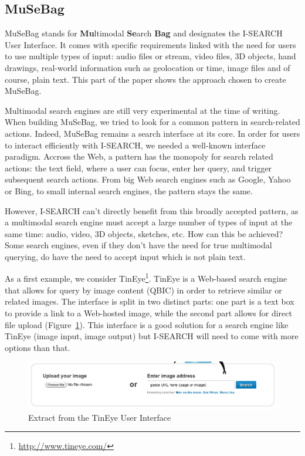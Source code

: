 \documentclass[runningheads,a4paper]{llncs} \usepackage[utf8]{inputenc}
\begin{document}
\subsection{MuSeBag}
MuSeBag stands for {\bf Mu}ltimodal {\bf Se}arch {\bf Bag} and designates the
\mbox{I-SEARCH} User Interface. It comes with specific requirements linked with the need for users to use multiple types of input: audio files or stream, video files, 3D objects, hand drawings, real-world information such as geolocation or time, image files and of course, plain text. This part of the paper shows the approach chosen to create MuSeBag.

Multimodal search engines are still very experimental at the time of writing. When building MuSeBag, we tried to look for a common pattern in search-related actions. Indeed, MuSeBag remains a search interface at its core. In order for users to interact efficiently with \mbox{I-SEARCH}, we needed a well-known interface paradigm. Accross the Web, a pattern has the monopoly for search related actions:  the text field, where a user can focus, enter her query, and trigger subsequent search actions. From big Web search engines such as Google, Yahoo or Bing, to small internal search engines, the pattern stays the same. 

However, \mbox{I-SEARCH} can't directly benefit from this broadly accepted pattern, as a multimodal search engine must accept a large number of types of input at the same time: audio, video, 3D objects, sketches, etc. How can this be achieved? Some search engines, even if they don't have the need for true multimodal querying, do have the need to accept input which is not plain text.

As a first example, we consider TinEye\footnote{\url{http://www.tineye.com/}}. TinEye is a Web-based search engine that allows for query by image content (QBIC) in order to retrieve similar or related images. The interface is split in two distinct parts: one part is a text box to provide a link to a Web-hosted image, while the second part allows for direct file upload (Figure~\ref{fig:tineye-ui}). This interface is a good solution for a search engine like TinEye (image input, image output) but \mbox{I-SEARCH} will need to come with more options than that.
\begin{figure}[h!]
  \centering
    \includegraphics[width=0.8\linewidth]{resources/tineye-UI.png}
  \caption{Extract from the TinEye User Interface}
  \label{fig:tineye-ui}
\end{figure}
\end{document}
